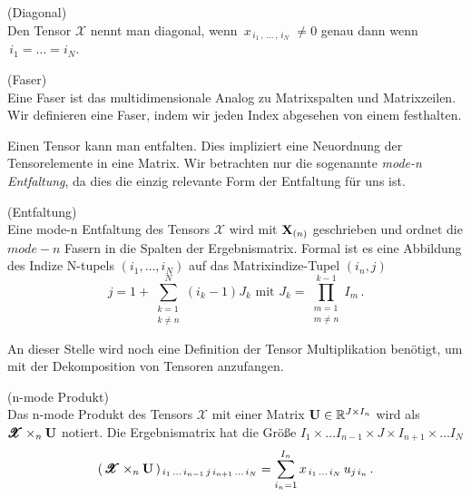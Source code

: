 \begin{Definition} (Diagonal) \\
Den Tensor $\pmb{\mathscr{X}}$ nennt man diagonal, wenn
$\, x_{ \, i_1 \,, \, \dots \, , \, i_N \, } \, \neq 0$ genau dann wenn \\ $\, i_1 = \dots = i_N$.
\end{Definition}

\begin{Definition} (Faser) \\
Eine Faser ist das multidimensionale Analog zu Matrixspalten und Matrixzeilen. Wir definieren eine Faser, indem wir jeden Index abgesehen von einem festhalten.
\end{Definition}

Einen Tensor kann man entfalten. Dies impliziert eine Neuordnung der Tensorelemente in eine Matrix.
Wir betrachten nur die sogenannte \textit{mode-n Entfaltung}, da dies die einzig relevante Form der Entfaltung für uns ist.

\begin{Bemerkung} (Entfaltung) \\
Eine mode-n Entfaltung des Tensors $\pmb{\mathscr{X}}$ wird mit $\bold{X}_{(n)}$ geschrieben und ordnet die $mode-n$ Fasern in die Spalten der Ergebnismatrix.
Formal ist es eine Abbildung des Indize N-tupels $(i_1,\dots,i_N)$ auf das Matrixindize-Tupel $(i_n,j) $
\begin{equation}
j=1+\sum_{\substack{k=1 \\ k \neq n}}^{N} (i_k-1)J_k \text{ mit } J_k = \prod_{\substack{m=1 \\ m \neq n}}^{k-1} I_m \, .
\end{equation}
\end{Bemerkung}

An dieser Stelle wird noch eine Definition der Tensor Multiplikation benötigt, um mit der Dekomposition von Tensoren anzufangen. 

\begin{Definition} (n-mode Produkt) \\
Das n-mode Produkt des Tensors $\pmb{\mathscr{X}}$ mit einer Matrix $\bold{U} \in \mathbb{R}^{J \times I_n}$ wird als $\pmb{\mathscr{X}} \times_n \bold{U}$ notiert. Die Ergebnismatrix hat die Größe $I_1 \times \dots I_{n-1} \times J \times I_{n+1} \times \dots I_N$
\begin{equation}
	(\, \pmb{\mathscr{X}} \times_n \bold{U} \, )_{\, i_1 \, \dots \, i_{n-1} \, j \, i_{n+1}\, \dots \, i_N} = \sum_{i_n = 1}^{I_n} x_{\, i_1 \, \dots \, i_N} \, u_{j \, i_n} \, .
\end{equation}
\end{Definition}

